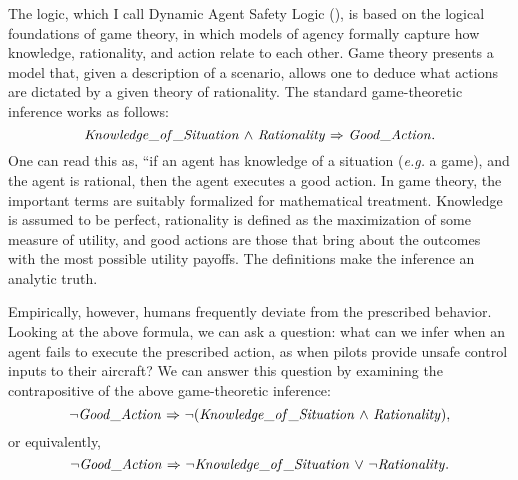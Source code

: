 
The logic, which I call Dynamic Agent Safety Logic (\DASL), is based on the logical foundations of game theory, in which models of agency formally capture how knowledge, rationality, and action relate to each other. Game theory presents a model that, given a description of a scenario, allows one to deduce what actions are dictated by a given theory of rationality. The standard game-theoretic inference works as follows:
\begin{equation*}
\mathit{Knowledge\_of\_Situation} {\ \wedge \ } \mathit{Rationality} {\ \Rightarrow \ } \mathit{Good\_Action}.
\end{equation*}
One can read this as, ``if an agent has knowledge of a situation (\emph{e.g.} a game), and the agent is rational, then the agent executes a good action. In game theory, the important terms are suitably formalized for mathematical treatment. Knowledge is assumed to be perfect, rationality is defined as the maximization of some measure of utility, and good actions are those that bring about the outcomes with the most possible utility payoffs. The definitions make the inference an analytic truth.

Empirically, however, humans frequently deviate from the prescribed behavior. Looking at the above formula, we can ask a question: what can we infer when an agent fails to execute the prescribed action, as when pilots provide unsafe control inputs to their aircraft? We can answer this question by examining the contrapositive of the above game-theoretic inference:
\begin{equation*}
{\neg} \mathit{Good\_Action} {\ \Rightarrow \ } {\neg} (\mathit{Knowledge\_of\_Situation} {\ \wedge \ } \mathit{Rationality}),
\end{equation*}
or equivalently,
\begin{equation*}
{\neg} \mathit{Good\_Action} {\ \Rightarrow \ } {\neg} \mathit{Knowledge\_of\_Situation} {\ \vee \ } {\neg} \mathit{Rationality}.
\end{equation*}
 
